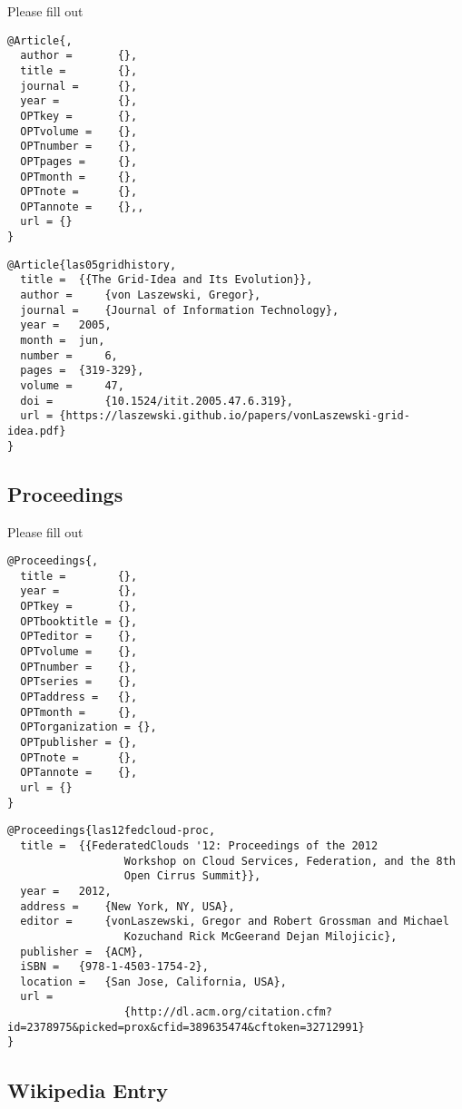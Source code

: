 Please fill out

\begin{verbatim}
@Article{,
  author =       {},
  title =        {},
  journal =      {},
  year =         {},
  OPTkey =       {},
  OPTvolume =    {},
  OPTnumber =    {},
  OPTpages =     {},
  OPTmonth =     {},
  OPTnote =      {},
  OPTannote =    {},,
  url = {}
}
\end{verbatim}

\begin{verbatim}
@Article{las05gridhistory,
  title =  {{The Grid-Idea and Its Evolution}},
  author =     {von Laszewski, Gregor},
  journal =    {Journal of Information Technology},
  year =   2005,
  month =  jun,
  number =     6,
  pages =  {319-329},
  volume =     47,
  doi =        {10.1524/itit.2005.47.6.319},
  url = {https://laszewski.github.io/papers/vonLaszewski-grid-idea.pdf}
}
\end{verbatim}

\subsection{Proceedings}\label{s:e:proceedings}

Please fill out

\begin{verbatim}
@Proceedings{,
  title =        {},
  year =         {},
  OPTkey =       {},
  OPTbooktitle = {},
  OPTeditor =    {},
  OPTvolume =    {},
  OPTnumber =    {},
  OPTseries =    {},
  OPTaddress =   {},
  OPTmonth =     {},
  OPTorganization = {},
  OPTpublisher = {},
  OPTnote =      {},
  OPTannote =    {},
  url = {}
}
\end{verbatim}

\begin{verbatim}
@Proceedings{las12fedcloud-proc,
  title =  {{FederatedClouds '12: Proceedings of the 2012
                  Workshop on Cloud Services, Federation, and the 8th
                  Open Cirrus Summit}},
  year =   2012,
  address =    {New York, NY, USA},
  editor =     {vonLaszewski, Gregor and Robert Grossman and Michael
                  Kozuchand Rick McGeerand Dejan Milojicic},
  publisher =  {ACM},
  iSBN =   {978-1-4503-1754-2},
  location =   {San Jose, California, USA},
  url =
                  {http://dl.acm.org/citation.cfm?id=2378975&picked=prox&cfid=389635474&cftoken=32712991}
}
\end{verbatim}

\subsection{Wikipedia Entry}\label{s:e:wikipedia-entry}

